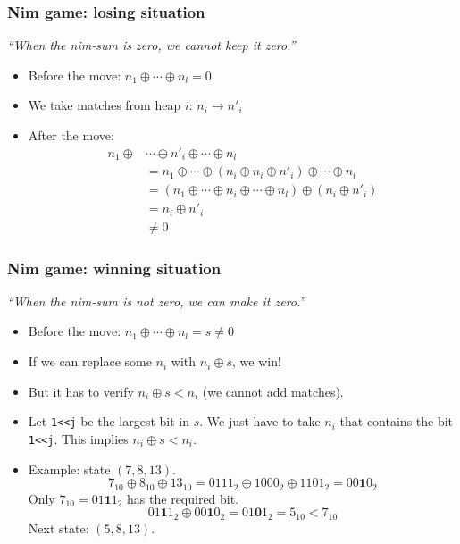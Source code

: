\documentclass[12pt]{beamer}
\begin{document}
\begin{frame}
\frametitle{Nim game: losing situation}
\begin{center} \emph{``When the nim-sum is zero, we cannot keep it zero.''} \end{center}
\begin{itemize}
\item Before the move: $n_1 \oplus \cdots \oplus n_l = 0$
\item We take matches from heap $i$: $n_i \rightarrow n'_i$
\item After the move:
\begin{align*}
n_1 \oplus &\cdots \oplus n'_i \oplus \cdots \oplus n_l \\
&= n_1 \oplus \cdots \oplus (n_i \oplus n_i \oplus n'_i) \oplus \cdots \oplus n_l \\
&= (n_1 \oplus \cdots \oplus n_i \oplus \cdots \oplus n_l) \oplus (n_i \oplus n'_i) \\
&= n_i \oplus n'_i \\
&\neq 0
\end{align*}
\end{itemize}
\end{frame}

\begin{frame}
\frametitle{Nim game: winning situation}
\begin{center} \emph{``When the nim-sum is not zero, we can make it zero.''} \end{center}
\begin{itemize}
\item Before the move: $n_1 \oplus \cdots \oplus n_l = s \neq 0$
\item If we can replace some $n_i$ with $n_i \oplus s$, we win!
\item But it has to verify $n_i \oplus s < n_i$ (we cannot add matches).
\item Let \lstinline|1<<j| be the largest bit in $s$. We just have to take $n_i$ that contains the bit \lstinline|1<<j|. This implies $n_i \oplus s < n_i$.
\item Example: state $(7,8,13)$.
\[7_{10} \oplus 8_{10} \oplus 13_{10} = 0111_2 \oplus 1000_2 \oplus 1101_2 = 00\mathbf{1}0_2\]
Only $7_{10}=01\mathbf{1}1_2$ has the required bit.
\[01\mathbf{1}1_2 \oplus 00\mathbf{1}0_2 = 01\mathbf{0}1_2 = 5_{10} < 7_{10}\]
Next state: $(5,8,13)$.
\end{itemize}
\end{frame}
\end{document}
